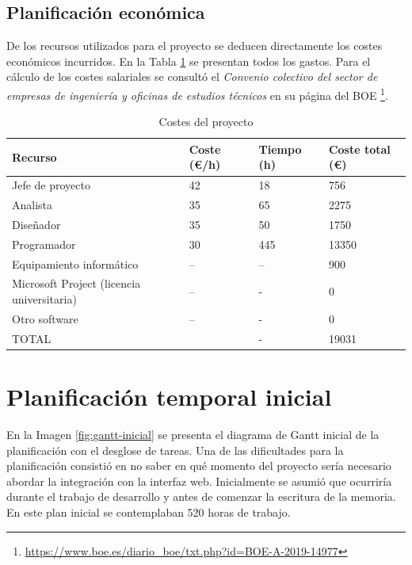 \subsection{Planificación económica}

De los recursos utilizados para el proyecto se deducen directamente los costes económicos incurridos. En la Tabla \ref{tab:costes-proyecto} se presentan todos los gastos. Para el cálculo de los costes salariales se consultó el \emph{Convenio colectivo del sector de empresas de ingeniería y oficinas de estudios técnicos} en su página del BOE \footnote{\url{https://www.boe.es/diario_boe/txt.php?id=BOE-A-2019-14977}}.

\begin{table}[ht]
    \centering
    \begin{tabular}{l l l l}
        Recurso & Coste (€/h) & Tiempo (h) & Coste total (€) \\
        \hline
        \hline
        Jefe de proyecto & 42 & 18 & 756 \\
        Analista & 35 & 65 & 2275 \\
        Diseñador & 35 & 50 & 1750 \\
        Programador & 30 & 445 & 13350 \\
        Equipamiento informático & -- & -- & 900 \\
        Microsoft Project (licencia universitaria) & -- & - & 0 \\
		Otro software & -- & - & 0 \\    
        \hline
        \hline
        TOTAL & & - & 19031 \\        
    \end{tabular}
	\caption{Costes del proyecto}    
	\label{tab:costes-proyecto}
\end{table}

\section{Planificación temporal inicial}

En la Imagen \ref{fig:gantt-inicial} se presenta el diagrama de Gantt inicial de la planificación con el desglose de tareas. Una de las dificultades para la planificación consistió en no saber en qué momento del proyecto sería necesario abordar la integración con la interfaz web. Inicialmente se asumió que ocurriría durante el trabajo de desarrollo y antes de comenzar la escritura de la memoria. En este plan inicial se contemplaban 520 horas de trabajo.

